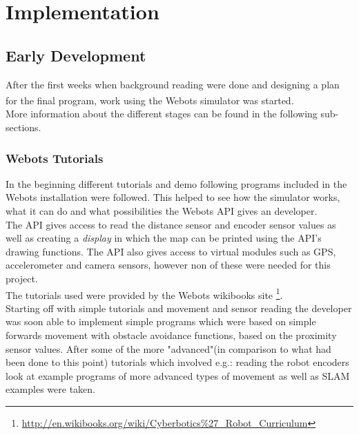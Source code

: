 \chapter{Implementation}
\label{Implementation}

\section{Early Development}
After the first weeks when background reading were done and designing a plan for the final program, work using the Webots\textsuperscript{\texttrademark} simulator was started. \\ More information about the different stages can be found in the following sub-sections.

\subsection{Webots Tutorials}
In the beginning different tutorials and demo following  programs included in the Webots installation were followed.
This helped to see how the simulator works, what it can do and what possibilities the Webots API gives an developer. \\
The API gives access to read the distance sensor and encoder sensor values as well as creating a \textit{display} in which the map can be printed using the API's drawing functions. The API also gives access to virtual modules such as GPS, accelerometer and camera sensors, however non of these were needed for this project.\\
The tutorials used were provided by the Webots wikibooks site \footnote{\url{http://en.wikibooks.org/wiki/Cyberbotics\%27_Robot_Curriculum}}.\\
Starting off with simple tutorials and movement and sensor reading the developer was soon able to implement simple programs which were based on simple forwards movement with obstacle avoidance functions, based on the proximity sensor values.
After some of the more "advanced"(in comparison to what had been done to this point) tutorials which involved e.g.: reading the robot encoders look at example programs of more advanced types of movement as well as SLAM examples were taken. \\[3ex]


